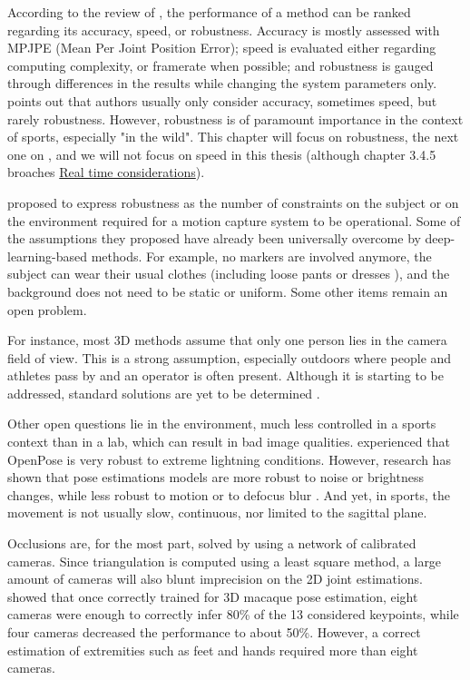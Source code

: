 According to the review of \cite{Desmarais2021}, the performance of a method can be ranked regarding its accuracy, speed, or robustness. Accuracy is mostly assessed with MPJPE (Mean Per Joint Position Error); speed is evaluated either regarding computing complexity, or framerate when possible; and robustness is gauged through differences in the results while changing the system parameters only. \cite{Desmarais2021} points out that authors usually only consider accuracy, sometimes speed, but rarely robustness. However, robustness is of paramount importance in the context of sports, especially "in the wild". This chapter will focus on robustness, the next one on , and we will not focus on speed in this thesis (although chapter 3.4.5 broaches \hyperref[subsec:realtime]{Real time considerations}).

\cite{Moeslund2001} proposed to express robustness as the number of constraints on the subject or on the environment required for a motion capture system to be operational. Some of the assumptions they proposed have already been universally overcome by deep-learning-based methods. For example, no markers are involved anymore, the subject can wear their usual clothes (including loose pants or dresses \cite{Viswakumar2019}), and the background does not need to be static or uniform. Some other items remain an open problem.

For instance, most 3D methods assume that only one person lies in the camera field of view. This is a strong assumption, especially outdoors where people and athletes pass by and an operator is often present. Although it is starting to be addressed, standard solutions are yet to be determined \cite{Slembrouck2020,Bridgeman2019, Chu2021, Dong2019}. 

Other open questions lie in the environment, much less controlled in a sports context than in a lab, which can result in bad image qualities. \cite{Viswakumar2019} experienced that OpenPose is very robust to extreme lightning conditions. However, research has shown that pose estimations models are more robust to noise or brightness changes, while less robust to motion or to defocus blur \cite{Wang2021b}. And yet, in sports, the movement is not usually slow, continuous, nor limited to the sagittal plane.

Occlusions are, for the most part, solved by using a network of calibrated cameras. Since triangulation is computed using a least square method, a large amount of cameras will also blunt imprecision on the 2D joint estimations. \cite{Bala2020} showed that once correctly trained for 3D macaque pose estimation, eight cameras were enough to correctly infer 80\% of the 13 considered keypoints, while four cameras decreased the performance to about 50\%. However, a correct estimation of extremities such as feet and hands required more than eight cameras.

